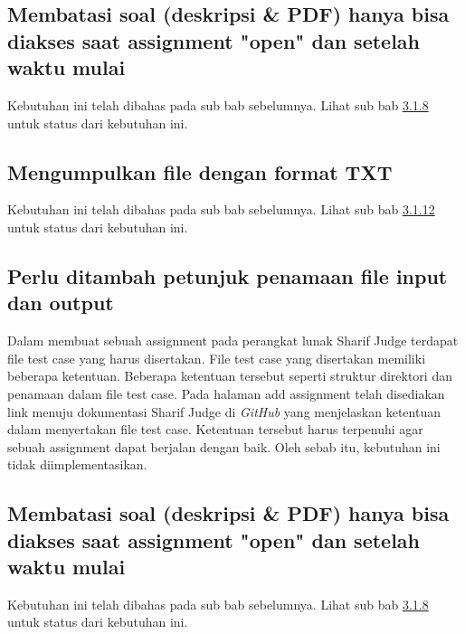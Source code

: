 \subsection{Membatasi soal (deskripsi \& PDF) hanya bisa diakses saat assignment "open" dan setelah waktu mulai}
Kebutuhan ini telah dibahas pada sub bab sebelumnya. Lihat sub bab \hyperref[subsec:membatasisoal]{3.1.8} untuk status dari kebutuhan ini.

\subsection{Mengumpulkan file dengan format TXT}
Kebutuhan ini telah dibahas pada sub bab sebelumnya. Lihat sub bab \hyperref[subsec:filetxt]{3.1.12} untuk status dari kebutuhan ini.

\subsection{Perlu ditambah petunjuk penamaan file input dan output}
Dalam membuat sebuah assignment pada perangkat lunak Sharif Judge terdapat file test case yang harus disertakan. File test case yang disertakan memiliki beberapa ketentuan. Beberapa ketentuan tersebut seperti struktur direktori dan penamaan dalam file test case. Pada halaman add assignment telah disediakan link menuju dokumentasi Sharif Judge di \textit{GitHub} yang menjelaskan ketentuan dalam menyertakan file test case. Ketentuan tersebut harus terpenuhi agar sebuah assignment dapat berjalan dengan baik. Oleh sebab itu, kebutuhan ini tidak diimplementasikan.

\subsection{Membatasi soal (deskripsi \& PDF) hanya bisa diakses saat assignment "open" dan setelah waktu mulai}
Kebutuhan ini telah dibahas pada sub bab sebelumnya. Lihat sub bab \hyperref[subsec:membatasisoal]{3.1.8} untuk status dari kebutuhan ini.

